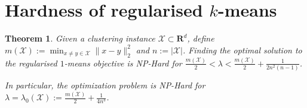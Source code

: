 \documentclass[12pt]{article}
\newcommand{\mc}{\mathcal}
\newcommand{\mb}{\mathbf}
\newtheorem{theorem}{Theorem}
\begin{document}
\fi

\section{Hardness of regularised $k$-means}
\label{a-section:hardness}
\begin{theorem}
\label{a-theorem:hardFork1Fixed}
Given a clustering instance $\mc X \subset \mb R^{d}$, define $m(\mc X) := \min_{x \neq y \in \mc X} \|x-y\|_{2}^2$ and $n := |\mc X|$. Finding the optimal solution to the regularised $1$-means objective is NP-Hard for $\frac{m(\mc X)}{2} < \lambda < \frac{m(\mc X)}{2} + \frac{1}{2n^2(n-1)}$. 

In particular, the optimization problem is NP-Hard for $\lambda = \lambda_0(\mc X) := \frac{m(\mc X)}{2} + \frac{1}{4n^3}$.
\end{theorem}
\end{document}

